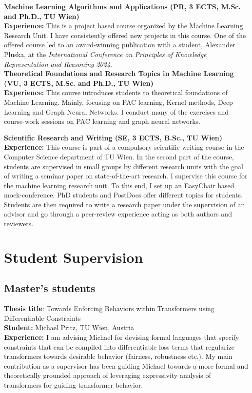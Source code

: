 \documentclass[10pt, a4paper]{article}
\newcommand{\years}[1]{\marginnote{\scriptsize #1}}
\begin{document}
\years{2023 - Now} \textbf{Machine Learning Algorithms and Applications 
(PR, 3 ECTS, M.Sc. and Ph.D., TU Wien)}\\
 \textbf{Experience:} This is a project based course organized by the Machine Learning Research Unit. I have consistently offered new projects in this course. One of the offered course led to an award-winning publication with a student, Alexander Pluska, at the \emph{International Conference on Principles of Knowledge Representation and Reasoning 2024}. \\ 
 

 \years{2023W - Now} \textbf{Theoretical Foundations and Research Topics in Machine Learning\\
 (VU, 3 ECTS, M.Sc. and Ph.D., TU Wien)\\}
 \textbf{Experience:} This course introduces students to theoretical foundations of Machine Learning. Mainly, focusing on PAC learning, Kernel methods, Deep Learning and Graph Neural Networks.
 I conduct many of the exercises and course-work sessions on PAC learning and graph neural networks.\\ 

 \newpage 

 \years{2023W - Now} \textbf{Scientific Research and Writing (SE, 3 ECTS, B.Sc., TU Wien)}\\
\textbf{Experience:} This course is part of a compulsory scientific writing course in the Computer Science department of TU Wien. In the second part of the course, students are supervised in small groups by different research units with the goal of writing a seminar paper on state-of-the-art research. I supervise this course for the machine learning research unit. To this end, I set up an EasyChair based mock-conference. PhD students and PostDocs offer different topics for students. Students are then required to write a research paper under the supervision of an advisor and go through a peer-review experience acting as both authors and reviewers.   



 \section*{Student Supervision}
\subsection*{Master's students}
 \years{2025S-Now} \textbf{Thesis title}: Towards Enforcing Behaviors within
 Transformers using Differentiable Constraints \\
 \textbf{Student:} Michael Pritz,  TU Wien, Austria\\
 \textbf{Experience:} I am advising Michael for devising formal languages that specify constraints that can be compiled into differentiable loss terms that regularize transformers towards desirable behavior (fairness, robustness etc.). My main contribution as a supervisor has been guiding Michael towards a more formal and theoretically grounded approach of leveraging expressivity analysis of transformers for guiding transformer behavior. \\ 
 
\end{document}
